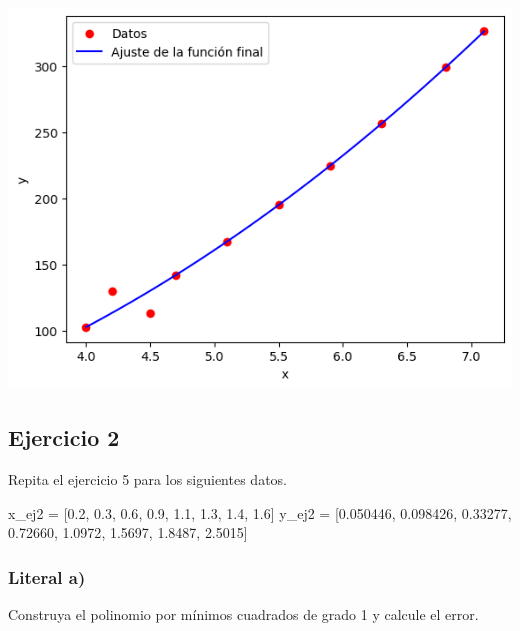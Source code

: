 \documentclass[
  letterpaper,
  DIV=11,
  numbers=noendperiod]{scrartcl}
\newenvironment{Shaded}{\begin{snugshade}}{\end{snugshade}}
\newcommand{\FloatTok}[1]{\textcolor[rgb]{0.68,0.00,0.00}{#1}}
\newcommand{\NormalTok}[1]{\textcolor[rgb]{0.00,0.23,0.31}{#1}}
\newcommand{\OperatorTok}[1]{\textcolor[rgb]{0.37,0.37,0.37}{#1}}
\begin{document}
\includegraphics{Tarea8_MN_files/figure-pdf/cell-8-output-2.png}

\subsection{Ejercicio 2}\label{ejercicio-2}

Repita el ejercicio 5 para los siguientes datos.

\begin{Shaded}
\begin{Highlighting}[]
\NormalTok{x\_ej2 }\OperatorTok{=}\NormalTok{ [}\FloatTok{0.2}\NormalTok{, }\FloatTok{0.3}\NormalTok{, }\FloatTok{0.6}\NormalTok{, }\FloatTok{0.9}\NormalTok{, }\FloatTok{1.1}\NormalTok{, }\FloatTok{1.3}\NormalTok{, }\FloatTok{1.4}\NormalTok{, }\FloatTok{1.6}\NormalTok{]}
\NormalTok{y\_ej2 }\OperatorTok{=}\NormalTok{ [}\FloatTok{0.050446}\NormalTok{, }\FloatTok{0.098426}\NormalTok{, }\FloatTok{0.33277}\NormalTok{, }\FloatTok{0.72660}\NormalTok{, }\FloatTok{1.0972}\NormalTok{, }\FloatTok{1.5697}\NormalTok{, }\FloatTok{1.8487}\NormalTok{, }\FloatTok{2.5015}\NormalTok{]}
\end{Highlighting}
\end{Shaded}

\subsubsection{Literal a)}\label{literal-a-1}

Construya el polinomio por mínimos cuadrados de grado 1 y calcule el
error.
\end{document}
